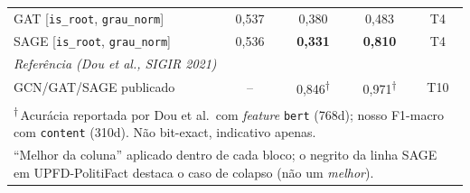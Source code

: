 \begin{table}[H]
\begin{tabular}{l|ccc|c}
GAT  {\scriptsize[\texttt{is\_root}, \texttt{grau\_norm}]}         & \cellcolor{cbad}0{,}537 & \cellcolor{cbad}0{,}380 & \cellcolor{cbad}0{,}483 & T4 \\
SAGE {\scriptsize[\texttt{is\_root}, \texttt{grau\_norm}]}         & \cellcolor{cbad}0{,}536 & \cellcolor{cbad}\textbf{0{,}331} & \cellcolor{cgood}\textbf{0{,}810} & T4 \\
\midrule
\multicolumn{5}{l}{\textit{Refer\^encia (Dou et al., SIGIR 2021)}} \\
\midrule
GCN/GAT/SAGE publicado & --     & 0{,}846\textsuperscript{$\dagger$} & 0{,}971\textsuperscript{$\dagger$} & T10 \\
\bottomrule
\multicolumn{5}{p{14cm}}{\scriptsize \textsuperscript{$\dagger$}\,Acur\'acia reportada por Dou et al.\ com \emph{feature} \texttt{bert} (768d); nosso F1-macro com \texttt{content} (310d). N\~ao bit-exact, indicativo apenas.} \\
\multicolumn{5}{p{14cm}}{\scriptsize ``Melhor da coluna'' aplicado dentro de cada bloco; o negrito da linha SAGE em UPFD-PolitiFact destaca o caso de colapso (n\~ao um \emph{melhor}).}
\end{tabular}
\end{table}
